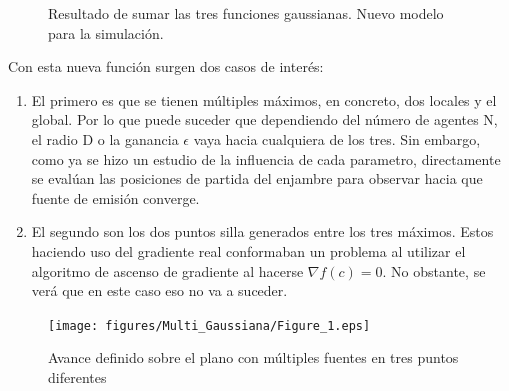 \begin{figure}[H]
  \begin{center}
    \caption{Resultado de sumar las tres funciones gaussianas. Nuevo modelo para la simulación.}
    \label{New_Gaussiana}
  \end{center}
\end{figure}
\newpage
Con esta nueva función surgen dos casos de interés:

\begin{enumerate}
	\item El primero es que se tienen múltiples máximos, en concreto, dos locales y el global. Por lo que puede suceder que dependiendo del número de agentes N, el radio D o la ganancia $\epsilon$ vaya hacia cualquiera de los tres. Sin embargo, como ya se hizo un estudio de la influencia de cada parametro, directamente se evalúan las posiciones de partida del enjambre para observar hacia que fuente de emisión converge.
	\item El segundo son los dos puntos silla generados entre los tres máximos. Estos haciendo uso del gradiente real conformaban un problema al utilizar el algoritmo de ascenso de gradiente al hacerse $\nabla{f\left(c\right)}=0$. No obstante, se verá que en este caso eso no va a suceder.
\end{enumerate}
	
\begin{figure}[H]
\centering
\texttt{[image: figures/Multi\_Gaussiana/Figure\_1.eps]}
\caption{Avance definido sobre el plano con múltiples fuentes en tres puntos diferentes} \label{Multiples_Fuentes}
\end{figure}

